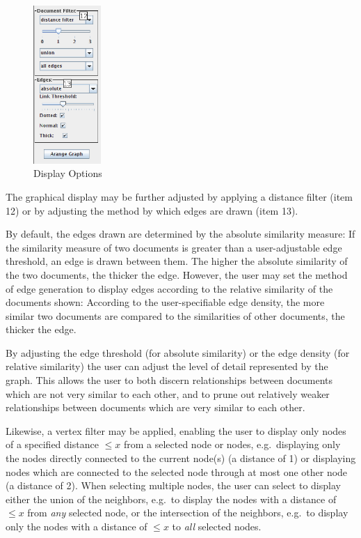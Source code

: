 \begin{figure}[ht]
\centering
\caption{Display Options}
\includegraphics[height=60mm]{displayopts.png}
\end{figure}

The graphical display may be further adjusted by applying a distance filter (item 12) or by adjusting the method by which edges are drawn (item 13).

By default, the edges drawn are determined by the absolute similarity measure: If the similarity measure of two documents is greater than a user-adjustable edge threshold, an edge is drawn between them. The higher the absolute similarity of the two documents, the thicker the edge. However, the user may set the method of edge generation to display edges according to the relative similarity of the documents shown: According to the user-specifiable edge density, the more similar two documents are compared to the similarities of other documents, the thicker the edge.

By adjusting the edge threshold (for absolute similarity) or the edge density (for relative similarity) the user can adjust the level of detail represented by the graph. This allows the user to both discern relationships between documents which are not very similar to each other, and to prune out relatively weaker relationships between documents which are very similar to each other.

Likewise, a vertex filter may be applied, enabling the user to display only nodes of a specified distance $\leq x$ from a selected node or nodes, e.g.\ displaying only the nodes directly connected to the current node(s) (a distance of 1) or displaying nodes which are connected to the selected node through at most one other node (a distance of 2). When selecting multiple nodes, the user can select to display either the union of the neighbors, e.g.\ to display the nodes with a distance of $\leq x$ from \emph{any} selected node, or the intersection of the neighbors, e.g.\ to display only the nodes with a distance of $\leq x$ to \emph{all} selected nodes.

